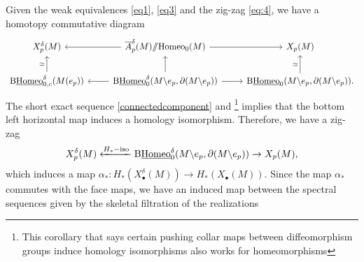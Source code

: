 \documentclass[a4paper]{amsart}
\newtheorem{lem}[thm]{Lemma}
\theoremstyle{definition}
\theoremstyle{remark}
\newcommand{\hcoker}{/\!\!/}
\newcommand{\X}{\mathbf{X}}
\newcommand{\tH}{\text{\textnormal{Homeo}}}
\newcommand{\BH}{\mathrm{B}\text{\textnormal{Homeo}}}
\newcommand{\BwH}{\mathrm{B}\underline{\text{\textnormal{Homeo}}}}
\newcommand{\BdwH}{\mathrm{B}\underline{\text{\textnormal{Homeo}}}^{\delta}}
\numberwithin{equation}{section}
\begin{document}
Given the weak equivalences \ref{eq1}, \ref{eq3} and the zig-zag \ref{eq:4}, we have a homotopy commutative diagram 
{\small
\begin{equation}\label{e}
\begin{gathered}
\begin{tikzcd}
X_p^{\delta}(M)& \overline{A}^{\delta}_{p}(M)\hcoker \tH_0(M)\arrow{l}\arrow[""]{r}&X_{p}(M) \\ \BdwH_{0,c}(M(e_p))\arrow["\simeq"]{u}&\BdwH_0(M\backslash e_p,\partial(M\backslash e_p))\arrow[""]{l}\arrow[]{u}\arrow[""]{r}& \BwH_0(M\backslash e_p,\partial(M\backslash e_p))\arrow["\simeq"]{u}.
\end{tikzcd}
 \end{gathered}
 \end{equation}}
The short exact sequence \ref{connectedcomponent} and \cite[Corollary 2.3]{nariman2014homologicalstability} \footnote{This corollary that says certain pushing collar maps between diffeomorphism groups induce homology isomorphisms also works for homeomorphisms} implies that the bottom left  horizontal map induces a homology isomorphism. Therefore, we have a zig-zag
\begin{equation}\label{eq}
\begin{gathered}
 X_{p}^{\delta}(M)\xleftarrow{H_*-\text{iso}} \BdwH_0(M\backslash e_p,\partial(M\backslash e_p))\to X_{p}(M),
 \end{gathered}
 \end{equation}
 which induces a map $\alpha_*: H_*(X_{\bullet}^{\delta}(M))\to H_*(X_{\bullet}(M))$.  Since the map $\alpha_*$ commutes with the face maps, we have an induced map between the spectral sequences given by the skeletal filtration of the realizations
\end{document}
